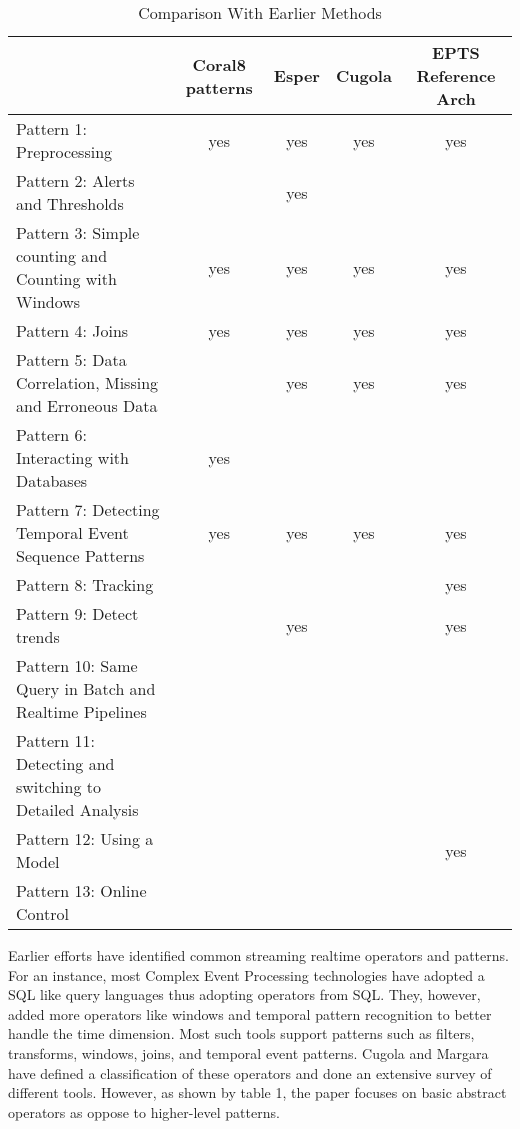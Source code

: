 \documentclass{sig-alternate}
\begin{document}
{\renewcommand{\arraystretch}{1.8}
\begin{table*}[htbp]
\begin{center}
\caption{Comparison With Earlier Methods}
\label{table:datasets}
\begin{tabular}{| l | c | c | c | c |}
\hline
& Coral8 patterns & Esper	& Cugola	& EPTS Reference Arch \\ \hline
Pattern 1: Preprocessing &	yes &	yes &	yes &	yes \\ \hline
Pattern 2: Alerts and Thresholds & & yes &  & \\ \hline		
Pattern 3: Simple counting and Counting with Windows & 	yes &	yes &	yes &	yes \\ \hline
Pattern 4: Joins &	yes &	yes &	yes	& yes \\ \hline
Pattern 5: Data Correlation, Missing and Erroneous Data & & yes	& yes	& yes \\ \hline
Pattern 6: Interacting with Databases & yes & & &		\\ \hline
Pattern 7: Detecting Temporal Event Sequence Patterns &	yes & yes & yes	& yes \\ \hline
Pattern 8: Tracking & & & &	yes \\ \hline
Pattern 9: Detect trends &  & yes	& &	yes \\ \hline
Pattern 10: Same Query in Batch and Realtime Pipelines & & & &\\ \hline
Pattern 11: Detecting and switching to Detailed Analysis & & & & \\ \hline
Pattern 12: Using a Model & & & &		yes \\ \hline
Pattern 13: Online Control & & & & \\ \hline
\end{tabular}
\end{center}
\end{table*}

Earlier efforts have identified common streaming realtime operators and patterns. For an instance, most Complex Event Processing technologies have adopted a SQL like query languages thus adopting operators from SQL. They, however, added more operators like windows and temporal pattern recognition to better handle the time dimension. Most such tools support patterns such as filters, transforms, windows, joins, and temporal event patterns. Cugola and Margara~\cite{cugolaprocessing} have defined a classification of these operators and done an extensive survey of different tools. However, as shown by table 1, the paper focuses on basic abstract operators as oppose to higher-level patterns. 

}
\end{document}
